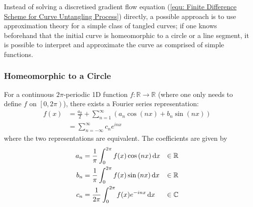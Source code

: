 \documentclass[../dissertation.tex]{subfiles}
\begin{document}
Instead of solving a discretised gradient flow equation (\ref{equ: Finite Difference Scheme for Curve Untangling Process}) directly,
a possible approach is to use approximation theory for a simple class of tangled curves;
if one knows beforehand that the initial curve is homeomorphic to a circle or a line segment,
it is possible to interpret and approximate the curve as comprised of simple functions.

\subsubsection{Homeomorphic to a Circle}
For a continuous $2\pi$-periodic 1D function $f:\mathbb{R} \rightarrow \mathbb{R}$
(where one only needs to define $f$ on $\left[ 0,2\pi \right)$),
there exists a Fourier series representation:
\begin{align}
    f(x) &= \frac{a_0}{2} + \sum_{n=1}^{\infty} \left( a_n \cos {(nx)} + b_n \sin {(nx)} \right) \\
    &= \sum_{n=-\infty}^{\infty} c_n e^{inx}
\end{align}
where the two representations are equivalent.
The coefficients are given by
\begin{align}
    a_n &= \frac{1}{\pi} \int_{0}^{2\pi} f(x) \cos {\left( nx \right)} \, \text{d} x &\in \mathbb{R}\\
    b_n &= \frac{1}{\pi} \int_{0}^{2\pi} f(x) \sin {\left( nx \right)} \, \text{d} x &\in \mathbb{R} \\
    c_n &= \frac{1}{2 \pi} \int_{0}^{2\pi} f(x) e^{-inx} \, \text{d} x &\in \mathbb{C}
\end{align}
\end{document}
